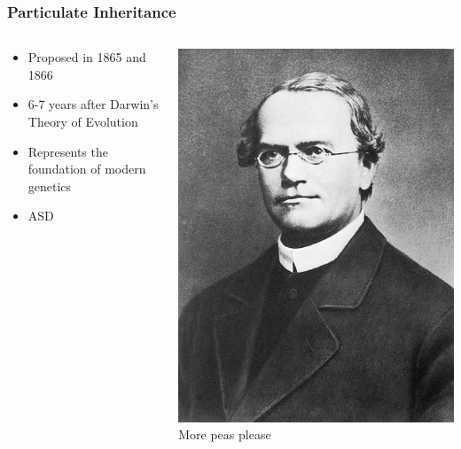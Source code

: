 \documentclass{beamer}
\begin{document}
\begin{frame}
	
	\frametitle{Particulate Inheritance}
	
	\begin{columns}[T]
		
		\begin{column}{0.6\textwidth}
			
			\begin{itemize}
				\item Proposed in 1865 and 1866
				\item 6-7 years after Darwin’s Theory of Evolution
				\item Represents the foundation of modern genetics
				\vspace{20pt}
				\item ASD
			\end{itemize}
			
			
		\end{column}
		\begin{column}{.4\textwidth}
			\includegraphics[keepaspectratio, width  =\textwidth]{img/mendel}
			\centering
			More peas please
		\end{column}
		

\end{columns}
\end{frame}
\end{document}
